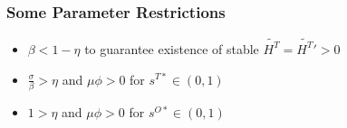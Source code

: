\documentclass[11pt]{beamer}
\begin{document}
		\begin{frame}
			\frametitle{Some Parameter Restrictions}
			\label{param}
			\begin{itemize}
				\item $\beta < 1-\eta$ to guarantee existence of stable $\widetilde{H^T} = \widetilde{H^T}' > 0$
				\item $\tfrac{\sigma}{\beta} > \eta$ and $\mu \phi > 0$ for $s^{T*} \in (0,1)$
				\item $1 > \eta$ and $\mu \phi > 0$ for $s^{O*} \in (0,1)$
			\end{itemize}
			\hyperlink{eqm}{}
		\end{frame}
		
\end{document}

